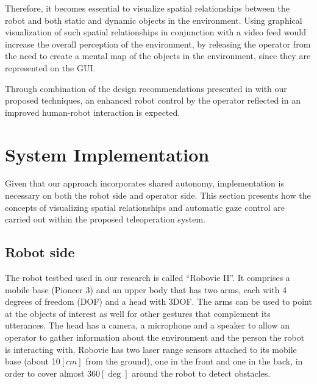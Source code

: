 \documentclass[journal]{IEEEtran}
\begin{document}

Therefore, it becomes essential to visualize spatial relationships between the robot and both static and dynamic objects in the environment.
Using graphical visualization of such spatial relationships in conjunction with a video feed would increase the overall perception of the environment, by releasing the operator from the need to create a mental map of the objects in the environment, since they are represented on the GUI.

Through combination of the design recommendations presented in \cite{nielsen:comparing} with our proposed techniques, an enhanced robot control by the operator reflected in an improved human-robot interaction is expected.

\section{System Implementation}
Given that our approach incorporates shared autonomy, implementation is necessary on both the robot side and operator side.
This section presents how the concepts of visualizing spatial relationships and automatic gaze control are carried out within the proposed teleoperation system. %


\subsection{Robot side}
\label{subsubsec:robotSide}
The robot testbed used in our research is called ``Robovie II''.
It comprises a mobile base (Pioneer 3) and an upper body that has two arms, each with 4 degrees of freedom (DOF) and a head with 3DOF.
The arms can be used to point at the objects of interest as well for other gestures that complement its utterances.
The head has a camera, a microphone and a speaker to allow an operator to gather information about the environment and the person the robot is interacting with.
Robovie has two laser range sensors attached to its mobile base (about 10$[cm]$ from the ground), one in the front and one in the back, in order to cover almost 360$[\deg]$ around the robot to detect obstacles.
\end{document}
